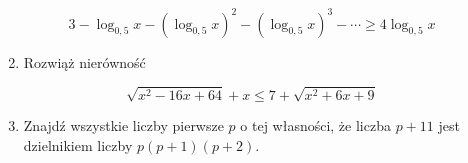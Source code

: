 \documentclass[10pt]{article}
\begin{document}
\[
3-\log _{0,5} x-\left(\log _{0,5} x\right)^{2}-\left(\log _{0,5} x\right)^{3}-\cdots \geq 4 \log _{0,5} x
\]

\begin{enumerate}
  \setcounter{enumi}{1}
  \item Rozwiąż nierówność
\end{enumerate}

\[
\sqrt{x^{2}-16 x+64}+x \leq 7+\sqrt{x^{2}+6 x+9}
\]

\begin{enumerate}
  \setcounter{enumi}{2}
  \item Znajdź wszystkie liczby pierwsze \(p\) o tej własności, że liczba \(p+11\) jest dzielnikiem liczby \(p(p+1)(p+2)\).
\end{enumerate}
\end{document}
